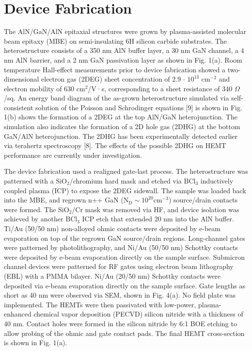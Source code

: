 \documentclass[journal]{IEEEtran}
\begin{document}
\section{Device Fabrication}
The AlN/GaN/AlN epitaxial structures were grown by plasma-assisted molecular beam epitaxy (MBE) on semi-insulating 6H silicon carbide substrates. The heterostructure consists of a 350 nm AlN buffer layer, a 30 nm GaN channel, a 4 nm AlN barrier, and a 2 nm GaN passivation layer as shown in Fig. 1(a). Room temperature Hall-effect measurements prior to device fabrication showed a two-dimensional electron gas (2DEG) sheet concentration of 2.9 $\cdot$ $\mathrm{10^{13}}$ $\mathrm{cm^{-2}}$ and electron mobility of 630 $\mathrm{cm^2}$/V·s, corresponding to a sheet resistance of 340 $\Omega$/sq. An energy band diagram of the as-grown heterostructure simulated via self-consistent solution of the Poisson and Schrodinger equations [9] is shown in Fig. 1(b) shows the formation of a 2DEG at the top AlN/GaN heterojunction. The simulation also indicates the formation of a 2D hole gas (2DHG) at the bottom GaN/AlN heterojunction. The 2DHG has been experimentally detected earlier via terahertz spectroscopy [8]. The effects of the possible 2DHG on HEMT performance are currently under investigation.

The device fabrication used a realigned gate-last process. The heterostructure was patterned with a $\mathrm{SiO_2}$/chromium hard mask and etched via $\mathrm{BCl_3}$ inductively coupled plasma (ICP) to expose the 2DEG sidewall. The sample was loaded back into the MBE, and regrown n++ GaN ($\mathrm{N_D}\sim10^{20} \mathrm{cm^{-3}}$) source/drain contacts were formed. The $\mathrm{SiO_2}$/Cr mask was removed via HF, and device isolation was achieved by another $\mathrm{BCl_3}$ ICP etch that extended 20 nm into the AlN buffer. Ti/Au (50/50 nm) non-alloyed ohmic contacts were deposited by e-beam evaporation on top of the regrown GaN source/drain regions. Long-channel gates were patterned by photolithography, and Ni/Au (50/50 nm) Schottky contacts were deposited by e-beam evaporation directly on the sample surface. Submicron channel devices were patterned for RF gates using electron beam lithography (EBL) with a PMMA bilayer. Ni/Au (20/50 nm) Schottky contacts were deposited via e-beam evaporation directly on the sample surface. Gate lengths as short as 40 nm were observed via SEM, shown in Fig. 4(a). No field plate was implemented. The HEMTs were then passivated with low-power, plasma-enhanced chemical vapor deposition (PECVD) silicon nitride with a thickness of 40 nm. Contact holes were formed in the silicon nitride by 6:1 BOE etching to allow probing of the ohmic and gate contact pads. The final HEMT cross-section is shown in Fig. 1(a).
\end{document}

